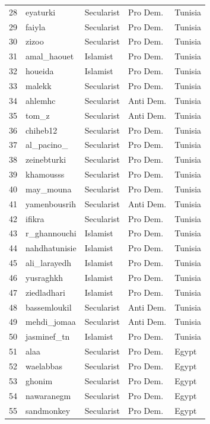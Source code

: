 \documentclass[12pt]{article}
\begin{document}
\begin{longtable}{rllll}
	28 & eyaturki & Secularist & Pro Dem. & Tunisia \\ 
	29 & faiyla & Secularist & Pro Dem. & Tunisia \\ 
	30 & zizoo & Secularist & Pro Dem. & Tunisia \\ 
	31 & amal\_haouet & Islamist & Pro Dem. & Tunisia \\ 
	32 & houeida & Islamist & Pro Dem. & Tunisia \\ 
	33 & malekk & Secularist & Pro Dem. & Tunisia \\ 
	34 & ahlemhc & Secularist & Anti Dem. & Tunisia \\ 
	35 & tom\_z & Secularist & Anti Dem. & Tunisia \\ 
	36 & chiheb12 & Secularist & Pro Dem. & Tunisia \\ 
	37 & al\_pacino\_ & Secularist & Pro Dem. & Tunisia \\ 
	38 & zeinebturki & Secularist & Pro Dem. & Tunisia \\ 
	39 & khamousss & Secularist & Pro Dem. & Tunisia \\ 
	40 & may\_mouna & Secularist & Pro Dem. & Tunisia \\ 
	41 & yamenbousrih & Secularist & Anti Dem. & Tunisia \\ 
	42 & ifikra & Secularist & Pro Dem. & Tunisia \\ 
	43 & r\_ghannouchi & Islamist & Pro Dem. & Tunisia \\ 
	44 & nahdhatunisie & Islamist & Pro Dem. & Tunisia \\ 
	45 & ali\_larayedh & Islamist & Pro Dem. & Tunisia \\ 
	46 & yusraghkh & Islamist & Pro Dem. & Tunisia \\ 
	47 & ziedladhari & Islamist & Pro Dem. & Tunisia \\ 
	48 & bassemloukil & Secularist & Anti Dem. & Tunisia \\ 
	49 & mehdi\_jomaa & Secularist & Anti Dem. & Tunisia \\ 
	50 & jasminef\_tn & Islamist & Pro Dem. & Tunisia \\ 
	51 & alaa & Secularist & Pro Dem. & Egypt \\ 
	52 & waelabbas & Secularist & Pro Dem. & Egypt \\ 
	53 & ghonim & Secularist & Pro Dem. & Egypt \\ 
	54 & nawaranegm & Secularist & Pro Dem. & Egypt \\ 
	55 & sandmonkey & Secularist & Pro Dem. & Egypt \\ 

\end{longtable}
\end{document}
